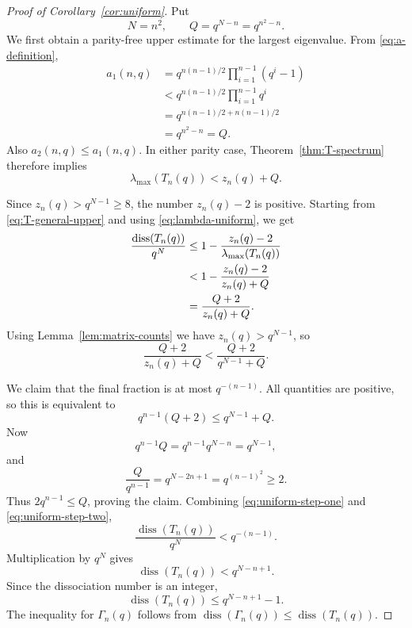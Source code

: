 \documentclass[11pt]{article}
\theoremstyle{definition}
\DeclareMathOperator{\diss}{diss}
\begin{document}
\begin{proof}[Proof of Corollary~\ref{cor:uniform}]
Put
\[
  N=n^2,
  \qquad
  Q=q^{N-n}=q^{n^2-n}.
\]
We first obtain a parity-free upper estimate for the largest eigenvalue. From \eqref{eq:a-definition},
\begin{align*}
 a_1(n,q)
 &=q^{n(n-1)/2}\prod_{i=1}^{n-1}(q^i-1)\\
 &<q^{n(n-1)/2}\prod_{i=1}^{n-1}q^i\\
 &=q^{n(n-1)/2+n(n-1)/2}\\
 &=q^{n^2-n}=Q.
\end{align*}
Also $a_2(n,q)\le a_1(n,q)$.  In either parity case, Theorem~\ref{thm:T-spectrum} therefore implies
\begin{equation}\label{eq:lambda-uniform}
  \lambda_{\max}(T_n(q))<z_n(q)+Q.
\end{equation}

Since $z_n(q)>q^{N-1}\ge8$, the number $z_n(q)-2$ is positive.  Starting from \eqref{eq:T-general-upper} and using
\eqref{eq:lambda-uniform}, we get
\begin{align}
 \frac{\diss(T_n(q))}{q^N}
 &\le1-\frac{z_n(q)-2}{\lambda_{\max}(T_n(q))}\notag\\
 &<1-\frac{z_n(q)-2}{z_n(q)+Q}\notag\\
 &=\frac{Q+2}{z_n(q)+Q}.                                 \label{eq:uniform-step-one}
\end{align}
Using Lemma~\ref{lem:matrix-counts} we have $z_n(q)>q^{N-1}$, so
\begin{equation}\label{eq:uniform-step-two}
  \frac{Q+2}{z_n(q)+Q}
  <\frac{Q+2}{q^{N-1}+Q}.
\end{equation}

We claim that the final fraction is at most $q^{-(n-1)}$.  All quantities are positive, so this is equivalent to
\[
  q^{n-1}(Q+2)\le q^{N-1}+Q.
\]
Now
\[
  q^{n-1}Q=q^{n-1}q^{N-n}=q^{N-1},
\]
and
\[
  \frac{Q}{q^{n-1}}
  =q^{N-2n+1}=q^{(n-1)^2}\ge2.
\]
Thus $2q^{n-1}\le Q$, proving the claim.  Combining \eqref{eq:uniform-step-one} and \eqref{eq:uniform-step-two},
\[
  \frac{\diss(T_n(q))}{q^N}<q^{-(n-1)}.
\]
Multiplication by $q^N$ gives
\[
  \diss(T_n(q))<q^{N-n+1}.
\]
Since the dissociation number is an integer,
\[
  \diss(T_n(q))\le q^{N-n+1}-1.
\]
The inequality for $\Gamma_n(q)$ follows from $\diss(\Gamma_n(q))\le\diss(T_n(q))$.
\end{proof}
\end{document}
